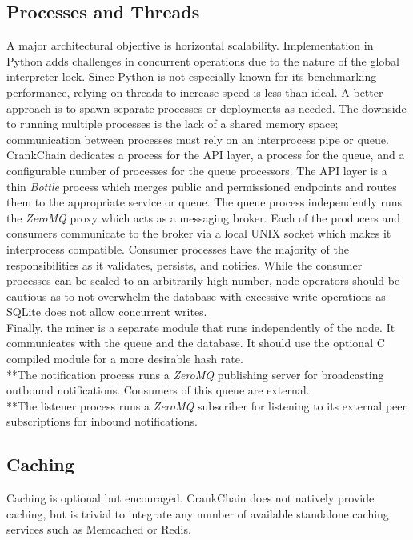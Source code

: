 \documentclass[10pt,twocolumn]{article}
\begin{document}
\subsection{Processes and Threads}
A major architectural objective is horizontal scalability.  Implementation in Python adds challenges in concurrent operations due to the nature of the global interpreter lock.  Since Python is not especially known for its benchmarking performance, relying on threads to increase speed is less than ideal.  A better approach is to spawn separate processes or deployments as needed.  The downside to running multiple processes is the lack of a shared memory space; communication between processes must rely on an interprocess pipe or queue.  CrankChain dedicates a process for the API layer, a process for the queue, and a configurable number of processes for the queue processors.  The API layer is a thin \textit{Bottle} process which merges public and permissioned endpoints and routes them to the appropriate service or queue.  The queue process independently runs the \textit{ZeroMQ} proxy which acts as a messaging broker.  Each of the producers and consumers communicate to the broker via a local UNIX socket which makes it interprocess compatible.  Consumer processes have the majority of the responsibilities as it validates, persists, and notifies.  While the consumer processes can be scaled to an arbitrarily high number, node operators should be cautious as to not overwhelm the database with excessive write operations as SQLite does not allow concurrent writes.\\  
Finally, the miner is a separate module that runs independently of the node.  It communicates with the queue and the database.  It should use the optional C compiled module for a more desirable hash rate.\\
**The notification process runs a \textit{ZeroMQ} publishing server for broadcasting outbound notifications.  Consumers of this queue are external.\\
**The listener process runs a \textit{ZeroMQ} subscriber for listening to its external peer subscriptions for inbound notifications.
\subsection{Caching}
Caching is optional but encouraged.  CrankChain does not natively provide caching, but is trivial to integrate any number of available standalone caching services such as Memcached or Redis.  
\end{document}
